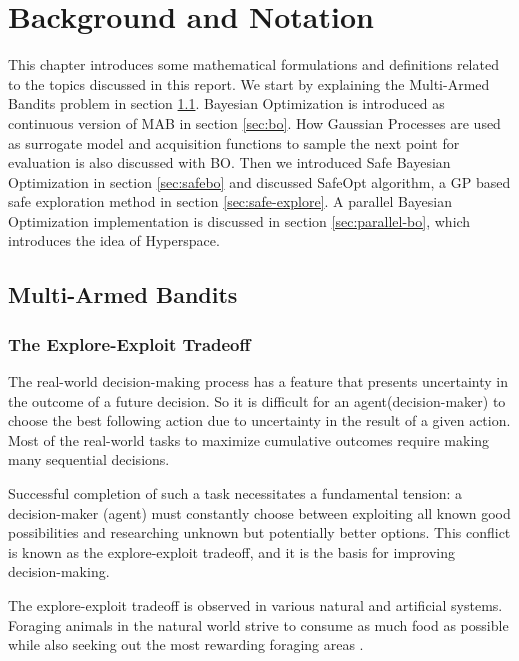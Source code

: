 \chapter{Background and Notation}\label{ch:background}

This chapter introduces some mathematical formulations and definitions related to the topics discussed in this report. We start by explaining the Multi-Armed Bandits problem in section \ref{sec:mab}. 
Bayesian Optimization is introduced as continuous version of MAB in section \ref{sec:bo}. How Gaussian Processes are used as surrogate model and acquisition functions to sample the next point for evaluation is also discussed with BO. 
Then we introduced Safe Bayesian Optimization in section \ref{sec:safebo} and discussed SafeOpt algorithm, a GP based safe exploration method in section \ref{sec:safe-explore}.
A parallel Bayesian Optimization implementation is discussed in section \ref{sec:parallel-bo}, which introduces the idea of Hyperspace.

\section{Multi-Armed Bandits}\label{sec:mab}
\subsection{The Explore-Exploit Tradeoff}
The real-world decision-making process has a feature that presents uncertainty in the outcome of a future decision. So it is difficult for an agent(decision-maker) to choose the best following action due to uncertainty in the result of a given action. Most of the real-world tasks to maximize cumulative outcomes require making many sequential decisions.

Successful completion of such a task necessitates a fundamental tension: a decision-maker (agent) must constantly choose between exploiting all known good possibilities and researching unknown but potentially better options. This conflict is known as the explore-exploit tradeoff, and it is the basis for improving decision-making.

The explore-exploit tradeoff is observed in various natural and artificial systems. Foraging animals in the natural world strive to consume as much food as possible while also seeking out the most rewarding foraging areas \cite{Keasar:2002}.

